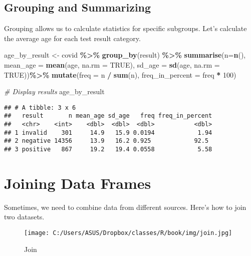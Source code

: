 \documentclass[
]{book}
\newenvironment{Shaded}{\begin{snugshade}}{\end{snugshade}}
\newcommand{\AttributeTok}[1]{\textcolor[rgb]{0.13,0.29,0.53}{#1}}
\newcommand{\CommentTok}[1]{\textcolor[rgb]{0.56,0.35,0.01}{\textit{#1}}}
\newcommand{\ConstantTok}[1]{\textcolor[rgb]{0.56,0.35,0.01}{#1}}
\newcommand{\DecValTok}[1]{\textcolor[rgb]{0.00,0.00,0.81}{#1}}
\newcommand{\FunctionTok}[1]{\textcolor[rgb]{0.13,0.29,0.53}{\textbf{#1}}}
\newcommand{\NormalTok}[1]{#1}
\newcommand{\OtherTok}[1]{\textcolor[rgb]{0.56,0.35,0.01}{#1}}
\newcommand{\SpecialCharTok}[1]{\textcolor[rgb]{0.81,0.36,0.00}{\textbf{#1}}}
\begin{document}
\subsection{Grouping and Summarizing}\label{grouping-and-summarizing}

Grouping allows us to calculate statistics for specific subgroups. Let's calculate the average age for each test result category.

\begin{Shaded}
\begin{Highlighting}[]
\NormalTok{age\_by\_result }\OtherTok{\textless{}{-}}\NormalTok{ covid }\SpecialCharTok{\%\textgreater{}\%}
  \FunctionTok{group\_by}\NormalTok{(result) }\SpecialCharTok{\%\textgreater{}\%}
  \FunctionTok{summarise}\NormalTok{(}\AttributeTok{n=}\FunctionTok{n}\NormalTok{(),}
            \AttributeTok{mean\_age =} \FunctionTok{mean}\NormalTok{(age, }\AttributeTok{na.rm =} \ConstantTok{TRUE}\NormalTok{),}
            \AttributeTok{sd\_age =} \FunctionTok{sd}\NormalTok{(age, }\AttributeTok{na.rm =} \ConstantTok{TRUE}\NormalTok{))}\SpecialCharTok{\%\textgreater{}\%}
  \FunctionTok{mutate}\NormalTok{(}\AttributeTok{freq =}\NormalTok{ n }\SpecialCharTok{/} \FunctionTok{sum}\NormalTok{(n), }\AttributeTok{freq\_in\_percent =}\NormalTok{ freq }\SpecialCharTok{*} \DecValTok{100}\NormalTok{)}

\CommentTok{\# Display results}
\NormalTok{age\_by\_result}
\end{Highlighting}
\end{Shaded}

\begin{verbatim}
## # A tibble: 3 x 6
##   result       n mean_age sd_age   freq freq_in_percent
##   <chr>    <int>    <dbl>  <dbl>  <dbl>           <dbl>
## 1 invalid    301     14.9   15.9 0.0194            1.94
## 2 negative 14356     13.9   16.2 0.925            92.5 
## 3 positive   867     19.2   19.4 0.0558            5.58
\end{verbatim}

\section{Joining Data Frames}\label{joining-data-frames}

Sometimes, we need to combine data from different sources. Here's how to join two datasets.

\begin{figure}
\centering
\texttt{[image: C:/Users/ASUS/Dropbox/classes/R/book/img/join.jpg]}
\caption{Join}
\end{figure}
\end{document}
